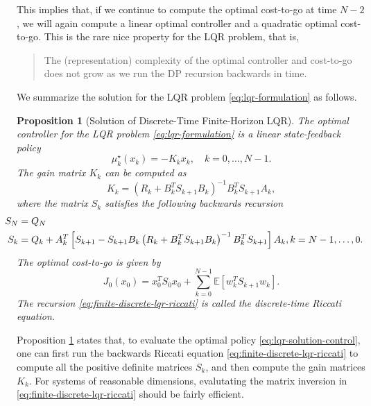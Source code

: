\documentclass[
]{book}
\newtheorem{proposition}{Proposition}[chapter]
\theoremstyle{definition}
\theoremstyle{definition}
\theoremstyle{definition}
\theoremstyle{definition}
\theoremstyle{remark}
\begin{document}
This implies that, if we continue to compute the optimal cost-to-go at time \(N-2\), we will again compute a linear optimal controller and a quadratic optimal cost-to-go. This is the rare nice property for the LQR problem, that is,

\begin{quote}
The (representation) complexity of the optimal controller and cost-to-go does not grow as we run the DP recursion backwards in time.
\end{quote}

We summarize the solution for the LQR problem \eqref{eq:lqr-formulation} as follows.

\begin{proposition}[Solution of Discrete-Time Finite-Horizon LQR]
\protect\hypertarget{prp:discretetimefinitehorizonlqrsolution}{}\label{prp:discretetimefinitehorizonlqrsolution}The optimal controller for the LQR problem \eqref{eq:lqr-formulation} is a linear state-feedback policy
\begin{equation}
\mu_k^\star(x_k) = - K_k x_k, \quad k=0,\dots,N-1.
\label{eq:lqr-solution-control}
\end{equation}
The gain matrix \(K_k\) can be computed as
\[
K_k = \left( R_k + B_k^T S_{k+1} B_k  \right)^{-1} B_k^T S_{k+1} A_k,
\]
where the matrix \(S_k\) satisfies the following backwards recursion
\begin{equation}
\hspace{-6mm}
\begin{split}
S_N &= Q_N \\
S_k &= Q_k + A_k^T \left[ S_{k+1} - S_{k+1}B_k \left( R_k + B_k^T S_{k+1} B_k  \right)^{-1}  B_k^T S_{k+1}  \right] A_k, k=N-1,\dots,0.
\end{split}
\label{eq:finite-discrete-lqr-riccati}
\end{equation}
The optimal cost-to-go is given by
\[
J_0(x_0) = x_0^T S_0 x_0 + \sum_{k=0}^{N-1} \mathbb{E} \left[ w_k^T S_{k+1} w_k\right].
\]
The recursion \eqref{eq:finite-discrete-lqr-riccati} is called the \emph{discrete-time Riccati equation}.
\end{proposition}

Proposition \ref{prp:discretetimefinitehorizonlqrsolution} states that, to evaluate the optimal policy \eqref{eq:lqr-solution-control}, one can first run the backwards Riccati equation \eqref{eq:finite-discrete-lqr-riccati} to compute all the positive definite matrices \(S_k\), and then compute the gain matrices \(K_k\). For systems of reasonable dimensions, evalutating the matrix inversion in \eqref{eq:finite-discrete-lqr-riccati} should be fairly efficient.
\end{document}
